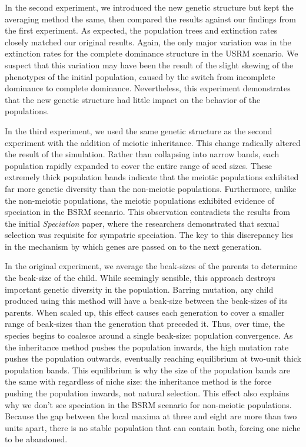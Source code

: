 \documentclass{article}
\begin{document}
In the second experiment, we introduced the new genetic structure but kept the averaging method the same, then compared the results against our findings from the first experiment. As expected, the population trees and extinction rates closely matched our original results. Again, the only major variation was in the extinction rates for the complete dominance structure in the USRM scenario. We suspect that this variation may have been the result of the slight skewing of the phenotypes of the initial population, caused by the switch from incomplete dominance to complete dominance. Nevertheless, this experiment demonstrates that the new genetic structure had little impact on the behavior of the populations.

In the third experiment, we used the same genetic structure as the second experiment with the addition of meiotic inheritance. This change radically altered the result of the simulation. Rather than collapsing into narrow bands, each population rapidly expanded to cover the entire range of seed sizes. These extremely thick population bands indicate that the meiotic populations exhibited far more genetic diversity than the non-meiotic populations. Furthermore, unlike the non-meiotic populations, the meiotic populations exhibited evidence of speciation in the BSRM scenario. This observation contradicts the results from the initial \textit{Speciation} paper, where the researchers demonstrated that sexual selection was requisite for sympatric speciation. The key to this discrepancy lies in the mechanism by which genes are passed on to the next generation. 

In the original experiment, we average the beak-sizes of the parents to determine the beak-size of the child. While seemingly sensible, this approach destroys important genetic diversity in the population. Barring mutation, any child produced using this method will have a beak-size between the beak-sizes of its parents. When scaled up, this effect causes each generation to cover a smaller range of beak-sizes than the generation that preceded it. Thus, over time, the species begins to coalesce around a single beak-size: population convergence. As the inheritance method pushes the population inwards, the high mutation rate pushes the population outwards, eventually reaching equilibrium at two-unit thick population bands. This equilibrium is why the size of the population bands are the same with regardless of niche size: the inheritance method is the force pushing the population inwards, not natural selection. This effect also explains why we don’t see speciation in the BSRM scenario for non-meiotic populations. Because the gap between the local maxima at three and eight are more than two units apart, there is no stable population that can contain both, forcing one niche to be abandoned.
\end{document}

